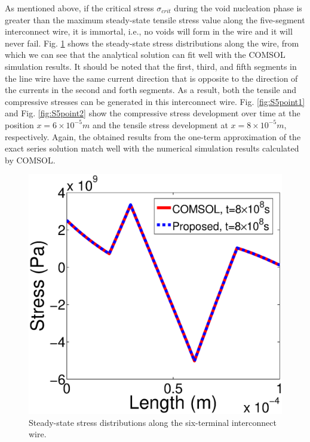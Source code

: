 As mentioned above, if the critical stress $\sigma_{crit}$ during the void nucleation phase is greater than the maximum steady-state tensile stress value along the five-segment interconnect wire, it is immortal, i.e., no voids will form in the wire and it will never fail. Fig. \ref{fig:S5StableT0} shows the steady-state stress distributions along the wire, from which we can see that the analytical solution can fit well with the COMSOL simulation results. It should be noted that the first, third, and fifth segments in the line wire have the same current direction that is opposite to the direction of the currents in the second and forth segments. As a result, both the tensile and compressive stresses can be generated in this interconnect wire. Fig. \ref{fig:S5point1} and Fig. \ref{fig:S5point2} show the compressive stress development over time at the position $x=6\times 10^{-5}m$ and the tensile stress development at $x=8\times 10^{-5}m$, respectively. Again, the obtained results from the one-term approximation of the exact series solution match well with the numerical simulation results calculated by COMSOL.

\begin{figure}[!h]
\centering
\includegraphics[width=0.7\columnwidth]{S5StableT0.eps}
\caption{Steady-state stress distributions along the six-terminal interconnect wire.}
\label{fig:S5StableT0}
\end{figure}

